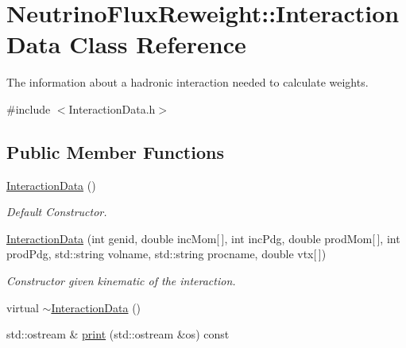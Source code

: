 \hypertarget{class_neutrino_flux_reweight_1_1_interaction_data}{\section{Neutrino\-Flux\-Reweight\-:\-:Interaction\-Data Class Reference}
\label{class_neutrino_flux_reweight_1_1_interaction_data}
}


The information about a hadronic interaction needed to calculate weights.  




{\ttfamily \#include $<$Interaction\-Data.\-h$>$}

\subsection*{Public Member Functions}
\begin{DoxyCompactItemize}
\item 
\hyperlink{class_neutrino_flux_reweight_1_1_interaction_data_ac47527367d019da881cb7ad1694b4214}{Interaction\-Data} ()
\begin{DoxyCompactList}\small\item\em Default Constructor. \end{DoxyCompactList}\item 
\hyperlink{class_neutrino_flux_reweight_1_1_interaction_data_a832dbbc46294421f64921f7f21fc8886}{Interaction\-Data} (int genid, double inc\-Mom\mbox{[}$\,$\mbox{]}, int inc\-Pdg, double prod\-Mom\mbox{[}$\,$\mbox{]}, int prod\-Pdg, std\-::string volname, std\-::string procname, double vtx\mbox{[}$\,$\mbox{]})
\begin{DoxyCompactList}\small\item\em Constructor given kinematic of the interaction. \end{DoxyCompactList}\item 
virtual \hyperlink{class_neutrino_flux_reweight_1_1_interaction_data_a6740ebf4fdfff91d8c5abccdcf0289bf}{$\sim$\-Interaction\-Data} ()
\item 
std\-::ostream \& \hyperlink{class_neutrino_flux_reweight_1_1_interaction_data_a4850209fb718e33836df141925a01f9e}{print} (std\-::ostream \&os) const 
\end{DoxyCompactItemize}
